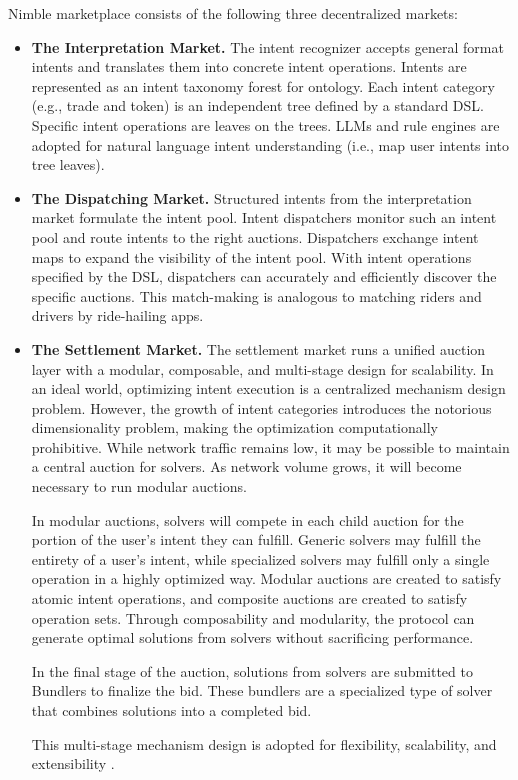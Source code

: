 \documentclass[11pt,letterpaper,twocolumn]{article}
\begin{document}
Nimble marketplace consists of the following three decentralized markets:
\begin{itemize}
\item \textbf{The Interpretation Market.} The intent recognizer accepts general format intents
and translates them into concrete intent operations. Intents are represented as an intent
taxonomy forest for ontology. Each intent category (e.g., trade and token) is an independent tree defined by a standard DSL. Specific intent operations are leaves on the trees. LLMs and rule engines are adopted for natural language intent understanding (i.e., map user intents into tree leaves).

\item \textbf{The Dispatching Market.} Structured intents from the interpretation market formulate the intent pool. Intent dispatchers monitor such an intent pool and route intents
to the right auctions. Dispatchers exchange intent maps to expand the visibility of the intent pool. With intent operations specified by the DSL, dispatchers can accurately and efficiently discover the specific auctions. This match-making is analogous to matching riders and drivers by ride-hailing apps.

\item \textbf{The Settlement Market.} The settlement market runs a unified auction layer with
a modular, composable, and multi-stage design for scalability. In an ideal world, optimizing
intent execution is a centralized mechanism design problem. However, the growth of
intent categories introduces the notorious dimensionality problem, making the optimization
computationally prohibitive. While network traffic remains low, it may be possible to maintain a central auction for solvers. As network volume grows, it will become necessary to run modular auctions. 

In modular auctions, solvers will compete in each child auction for the portion of the user’s intent they can fulfill. Generic solvers may fulfill the entirety of a user’s intent, while specialized solvers may fulfill only a single operation in a highly optimized way. Modular auctions are created to satisfy atomic intent operations, and composite auctions are created to satisfy operation sets. Through composability and modularity, the protocol can generate optimal solutions from solvers without sacrificing performance.

In the final stage of the auction, solutions from solvers are submitted to Bundlers to finalize the bid. These bundlers are a specialized type of solver that combines solutions into a completed bid.

This multi-stage mechanism design is adopted for flexibility, scalability, and extensibility \cite{sandholm2007automated}.

\end{itemize}
\end{document}
